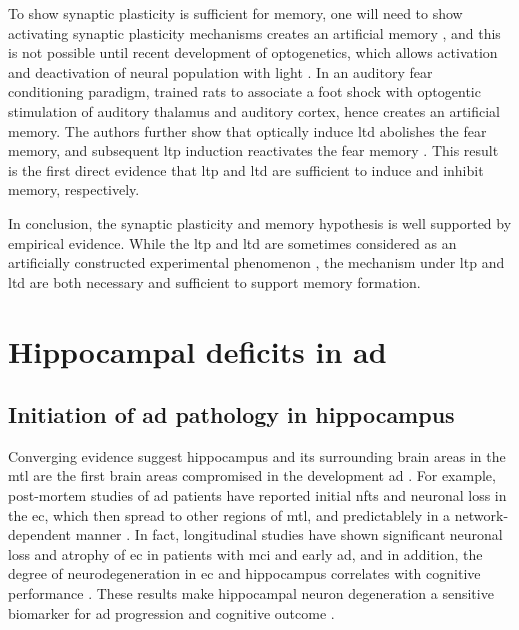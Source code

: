 To show synaptic plasticity is sufficient for memory, one will need to show activating synaptic plasticity mechanisms creates an artificial memory \citep{neves08}, and this is not possible until recent development of optogenetics, which allows activation and deactivation of neural population with light  \citep{zhang07, rajasethupathy16}. In an auditory fear conditioning paradigm, \citet{nabavi14} trained rats to associate a foot shock with optogentic stimulation of auditory thalamus and auditory cortex, hence creates an artificial memory. The authors further show that optically induce \gls{ltd} abolishes the fear memory, and subsequent \gls{ltp} induction reactivates the fear memory \citep{nabavi14}. This result is the first direct evidence that \gls{ltp} and \gls{ltd} are sufficient to induce and inhibit memory, respectively. 

In conclusion, the synaptic plasticity and memory hypothesis is well supported by empirical evidence. While the \gls{ltp} and \gls{ltd} are sometimes considered as an artificially constructed experimental phenomenon \citep{stevens98}, the mechanism under \gls{ltp} and \gls{ltd} are both necessary and sufficient to support memory formation.

\section{Hippocampal deficits in \gls{ad}}
\subsection{Initiation of \gls{ad} pathology in hippocampus}
Converging evidence suggest hippocampus and its surrounding brain areas in the \gls{mtl} are the first brain areas compromised in the development \gls{ad} \citep{palmer11, zhou16}. For example, post-mortem studies of \gls{ad} patients have reported initial \glspl{nft} and neuronal loss in the \gls{ec}, which then spread to other regions of \gls{mtl}, and predictablely in a network-dependent manner \citep{braak91,  hoesen93, zhan09}. In fact, longitudinal studies have shown significant neuronal loss and atrophy of \gls{ec} in patients with \gls{mci} and early \gls{ad}, and in addition, the degree of neurodegeneration in \gls{ec} and hippocampus correlates with cognitive performance \citep{kordower01, jack02, pennanen04}. These results make hippocampal neuron degeneration a sensitive biomarker for \gls{ad} progression and cognitive outcome \citep{jack02, zhou16}. 

